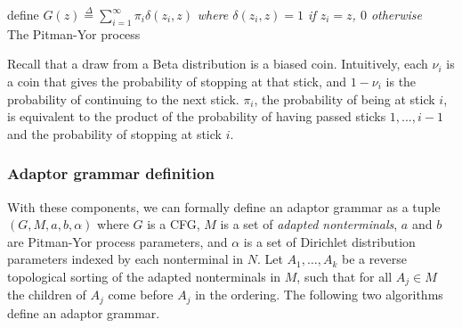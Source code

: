\documentclass[12pt,letterpaper]{article}
\begin{document}
\begin{algorithm}[H]
define $G(z) \overset{\Delta}{=} \sum\limits_{i=1}^\infty \pi_i \delta(z_i, z)$ \emph{where $\delta(z_i,z) = 1$ if $z_i = z$, $0$ otherwise}\\
\caption{The Pitman-Yor process}
\end{algorithm}
\vspace{1em}
\noindent Recall that a draw from a Beta distribution is a biased coin. Intuitively, each $\nu_i$ is a coin that gives the probability of stopping at that stick, and $1-\nu_i$ is the probability of continuing to the next stick. $\pi_i$, the probability of being at stick $i$, is equivalent to the product of the probability of having passed sticks $1,...,i-1$ and the probability of stopping at stick $i$. 

\subsubsection{Adaptor grammar definition}
With these components, we can formally define an adaptor grammar as a tuple $(G, M, a, b, \alpha)$ where $G$ is a CFG, $M$ is a set of \textit{adapted nonterminals}, $a$ and $b$ are Pitman-Yor process parameters, and $\alpha$ is a set of Dirichlet distribution parameters indexed by each nonterminal in $N$. Let $A_1,\ldots,A_k$ be a reverse topological sorting of the adapted nonterminals in $M$, such that for all $A_j \in M$ the children of $A_j$ come before $A_j$ in the ordering. The following two algorithms define an adaptor grammar.

\end{document}
